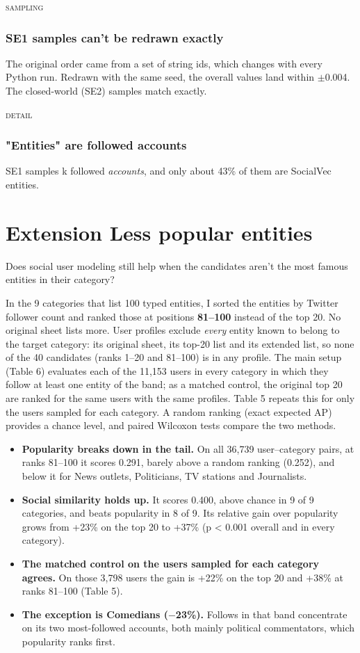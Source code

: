 \documentclass[10pt]{article}
\begin{document}
\noindent\textsc{sampling}\par
\subsubsection*{SE1 samples can't be redrawn exactly}
The original order came from a set of string ids, which changes with every Python run. Redrawn with the same seed, the overall values land within $\pm$0.004. The closed-world (SE2) samples match exactly.

\noindent\textsc{detail}\par
\subsubsection*{"Entities" are followed accounts}
SE1 samples k followed \emph{accounts}, and only about 43\% of them are SocialVec entities.

\section{Extension \textperiodcentered{} Less popular entities}
Does social user modeling still help when the candidates aren't the most famous entities in their category?

In the 9 categories that list 100 typed entities, I sorted the entities by Twitter follower count and ranked those at positions \textbf{81--100} instead of the top 20. No original sheet lists more. User profiles exclude \emph{every} entity known to belong to the target category: its original sheet, its top-20 list and its extended list, so none of the 40 candidates (ranks 1--20 and 81--100) is in any profile. The main setup (Table 6) evaluates each of the 11,153 users in every category in which they follow at least one entity of the band; as a matched control, the original top 20 are ranked for the same users with the same profiles. Table 5 repeats this for only the users sampled for each category. A random ranking (exact expected AP) provides a chance level, and paired Wilcoxon tests compare the two methods.

\begin{itemize}
  \item \textbf{Popularity breaks down in the tail.} On all 36,739 user--category pairs, at ranks 81--100 it scores 0.291, barely above a random ranking (0.252), and below it for News outlets, Politicians, TV stations and Journalists.
  \item \textbf{Social similarity holds up.} It scores 0.400, above chance in 9 of 9 categories, and beats popularity in 8 of 9. Its relative gain over popularity grows from +23\% on the top 20 to +37\% (p \textless{} 0.001 overall and in every category).
  \item \textbf{The matched control on the users sampled for each category agrees.} On those 3,798 users the gain is +22\% on the top 20 and +38\% at ranks 81--100 (Table 5).
  \item \textbf{The exception is Comedians ($-$23\%).} Follows in that band concentrate on its two most-followed accounts, both mainly political commentators, which popularity ranks first.
\end{itemize}
\end{document}

